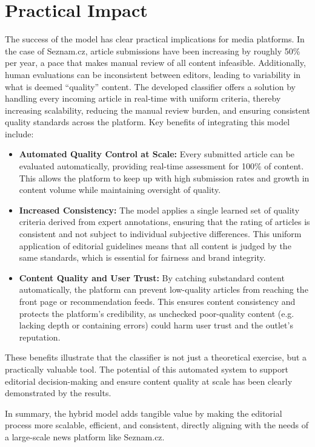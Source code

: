 \section{Practical Impact}
The success of the model has clear practical implications for media platforms. In the case of Seznam.cz, article submissions have been increasing by roughly 50\% per year, a pace that makes manual review of all content infeasible. Additionally, human evaluations can be inconsistent between editors, leading to variability in what is deemed “quality” content. The developed classifier offers a solution by handling every incoming article in real-time with uniform criteria, thereby increasing scalability, reducing the manual review burden, and ensuring consistent quality standards across the platform. Key benefits of integrating this model include:
\begin{itemize}
  \item \textbf{Automated Quality Control at Scale:} Every submitted article can be evaluated automatically, providing real-time assessment for 100\% of content. This allows the platform to keep up with high submission rates and growth in content volume while maintaining oversight of quality.
  \item \textbf{Increased Consistency:} The model applies a single learned set of quality criteria derived from expert annotations, ensuring that the rating of articles is consistent and not subject to individual subjective differences. This uniform application of editorial guidelines means that all content is judged by the same standards, which is essential for fairness and brand integrity.
  \item \textbf{Content Quality and User Trust:} By catching substandard content automatically, the platform can prevent low-quality articles from reaching the front page or recommendation feeds. This ensures content consistency and protects the platform’s credibility, as unchecked poor-quality content (e.g. lacking depth or containing errors) could harm user trust and the outlet’s reputation.
\end{itemize}

These benefits illustrate that the classifier is not just a theoretical exercise, but a practically valuable tool. The potential of this automated system to support editorial decision-making and ensure content quality at scale has been clearly demonstrated by the results. 

In summary, the hybrid model adds tangible value by making the editorial process more scalable, efficient, and consistent, directly aligning with the needs of a large-scale news platform like Seznam.cz.


